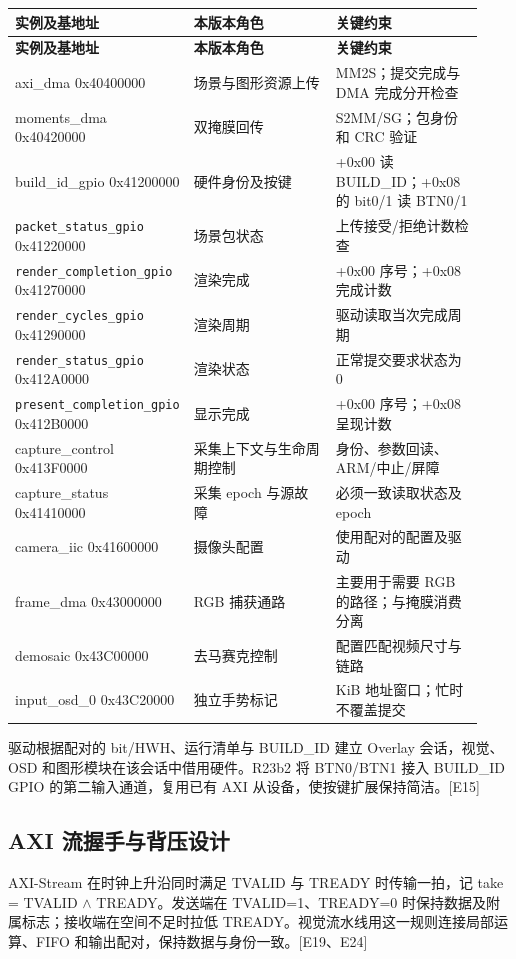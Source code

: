 {\small\renewcommand{\arraystretch}{1.28}
\begin{longtable}{@{}>{\raggedright\arraybackslash}p{0.24\linewidth}>{\raggedright\arraybackslash}p{0.35\linewidth}>{\raggedright\arraybackslash}p{0.34\linewidth}@{}}
\toprule
\bfseries 实例及基地址 & \bfseries 本版本角色 & \bfseries 关键约束\\\midrule
\endfirsthead
\toprule
\bfseries 实例及基地址 & \bfseries 本版本角色 & \bfseries 关键约束\\\midrule
\endhead
\bottomrule\endfoot
axi\_dma 0x40400000 & 场景与图形资源上传 & MM2S；提交完成与 DMA 完成分开检查\\
moments\_dma 0x40420000 & 双掩膜回传 & S2MM/SG；包身份和 CRC 验证\\
build\_id\_gpio 0x41200000 & 硬件身份及按键 & +0x00 读 BUILD\_ID；+0x08 的 bit0/1 读 BTN0/1\\
\nolinkurl{packet_status_gpio} 0x41220000 & 场景包状态 & 上传接受/拒绝计数检查\\
\nolinkurl{render_completion_gpio} 0x41270000 & 渲染完成 & +0x00 序号；+0x08 完成计数\\
\nolinkurl{render_cycles_gpio} 0x41290000 & 渲染周期 & 驱动读取当次完成周期\\
\nolinkurl{render_status_gpio} 0x412A0000 & 渲染状态 & 正常提交要求状态为 0\\
\nolinkurl{present_completion_gpio} 0x412B0000 & 显示完成 & +0x00 序号；+0x08 呈现计数\\
capture\_control 0x413F0000 & 采集上下文与生命周期控制 & 身份、参数回读、ARM/中止/屏障\\
capture\_status 0x41410000 & 采集 epoch 与源故障 & 必须一致读取状态及 epoch\\
camera\_iic 0x41600000 & 摄像头配置 & 使用配对的配置及驱动\\
frame\_dma 0x43000000 & RGB 捕获通路 & 主要用于需要 RGB 的路径；与掩膜消费分离\\
demosaic 0x43C00000 & 去马赛克控制 & 配置匹配视频尺寸与链路\\
input\_osd\_0 0x43C20000 & 独立手势标记 & 4 KiB 地址窗口；忙时不覆盖提交\\
\end{longtable}}
驱动根据配对的 bit/HWH、运行清单与 BUILD\_ID 建立 Overlay 会话，视觉、OSD 和图形模块在该会话中借用硬件。R23b2 将 BTN0/BTN1 接入 BUILD\_ID GPIO 的第二输入通道，复用已有 AXI 从设备，使按键扩展保持简洁。[E15]

\subsection{AXI 流握手与背压设计}
AXI-Stream 在时钟上升沿同时满足 TVALID 与 TREADY 时传输一拍，记 take = TVALID $\land$ TREADY。发送端在 TVALID=1、TREADY=0 时保持数据及附属标志；接收端在空间不足时拉低 TREADY。视觉流水线用这一规则连接局部运算、FIFO 和输出配对，保持数据与身份一致。[E19、E24]

